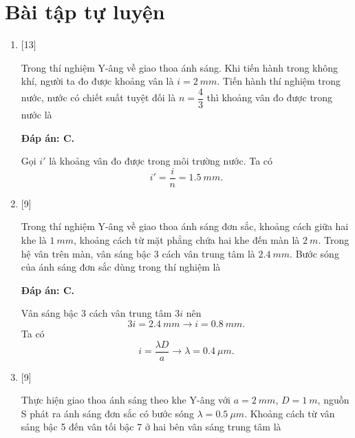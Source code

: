 \section{Bài tập tự luyện}
\begin{enumerate}[label=\bfseries Câu \arabic*:]
	
	\item {} [13]
	\cauhoi
	{Trong thí nghiệm Y-âng về giao thoa ánh sáng. Khi tiến hành trong không khí, người ta đo được khoảng vân là $i = \SI{2}{mm}$. Tiến hành thí nghiệm trong nước, nước có chiết suất tuyệt đối là $n = \dfrac{4}{3}$ thì khoảng vân đo được trong nước là
	}
	
	\loigiai
	{		\textbf{Đáp án: C.}
		
		Gọi $i'$ là khoảng vân đo được trong môi trường nước. Ta có
		$$
		i' = \dfrac{i}{n} = \SI{1,5}{mm}.
		$$
	}
	
	\item {} [9]
	\cauhoi
	{Trong thí nghiệm Y-âng về giao thoa ánh sáng đơn sắc, khoảng cách giữa hai khe là $\SI{1}{mm}$, khoảng cách từ mặt phẳng chứa hai khe đến màn là $\SI{2}{m}$. Trong hệ vân trên màn, vân sáng bậc 3 cách vân trung tâm là $\SI{2,4}{mm}$. Bước sóng của ánh sáng đơn sắc dùng trong thí nghiệm là 
	}
	
	\loigiai
	{		\textbf{Đáp án: C.}
		
		Vân sáng bậc 3 cách vân trung tâm $3i$ nên
		$$
		3i = \SI{2,4}{mm} \rightarrow i = \SI{0,8}{mm}.
		$$
		Ta có
		$$
		i = \dfrac{\lambda D}{a} \rightarrow \lambda = \SI{0,4}{\mu m}.
		$$
	}
	
	\item {} [9]
	\cauhoi
	{Thực hiện giao thoa ánh sáng theo khe Y-âng với $a = \SI{2}{mm}$, $D= \SI{1}{m}$, nguồn S phát ra ánh sáng đơn sắc có bước sóng $\lambda = \SI{0,5}{\mu m}$. Khoảng cách từ vân sáng bậc 5 đến vân tối bậc 7 ở hai bên vân sáng trung tâm là
	}
	

\end{enumerate}
